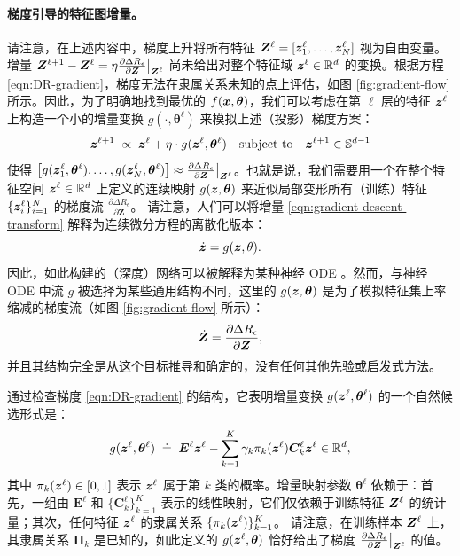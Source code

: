 \documentclass[../../book-main.tex]{subfiles}
\begin{document}
\paragraph{梯度引导的特征图增量。} 请注意，在上述内容中，梯度上升将所有特征 $\bm{Z}^{\ell} = [\bm{z}^{\ell}_{1}, \dots, \bm{z}^{\ell}_{N}]$ 视为自由变量。增量 $\bm{Z}^{\ell+1} - \bm{Z}^{\ell} = \eta \frac{\partial \Delta R_{\epsilon}}{\partial \bm Z}\big|_{\bm{Z}^\ell}$ 尚未给出对整个特征域 $\bm{z}^\ell \in \mathbb{R}^d$ 的变换。根据方程 \eqref{eqn:DR-gradient}，梯度无法在隶属关系未知的点上评估，如图 \ref{fig:gradient-flow} 所示。因此，为了明确地找到最优的 $f(\bm{x},\bm  \theta)$，我们可以考虑在第 $\ell$ 层的特征 $\bm{z}^\ell$ 上构造一个小的增量变换 $g(\cdot, \bm{\theta}^{\ell})$ 来模拟上述（投影）梯度方案：
\begin{equation}
\bm{z}^{\ell + 1}   \; \propto \; \bm{z}^{\ell} + \eta\cdot  g(\bm{z}^{\ell}, \bm{\theta}^{\ell}) \quad \mbox{subject to} \quad \bm{z}^{\ell +1} \in \mathbb{S}^{d-1}
\label{eqn:gradient-descent-transform}
\end{equation}
使得 $\big[g(\bm{z}_1^{\ell}, \bm \theta^{\ell}), \ldots, g(\bm{z}_N^{\ell}, \bm \theta^{\ell}) \big] \approx \frac{\partial \Delta R_{\epsilon}}{\partial \bm Z}\big|_{\bm{Z}^\ell}$。也就是说，我们需要用一个在整个特征空间 $\bm{z}^\ell \in \mathbb{R}^d$ 上定义的连续映射 $g(\bm{z},\bm \theta)$ 来近似局部变形所有（训练）特征 $\{\bm{z}_i^\ell\}_{i=1}^N$ 的梯度流 $\frac{\partial \Delta R_{\epsilon}}{\partial \bm Z}$。
请注意，人们可以将增量 \eqref{eqn:gradient-descent-transform} 解释为连续微分方程的离散化版本：
\begin{equation}
\dot{\bm{z}} = g(\bm{z}, \theta).
\end{equation}
因此，如此构建的（深度）网络可以被解释为某种神经 ODE \cite{chen2018neural}。然而，与神经 ODE 中流 $g$ 被选择为某些通用结构不同，这里的 $g(\bm{z}, \bm\theta)$ 是为了模拟特征集上率缩减的梯度流（如图 \ref{fig:gradient-flow} 所示）：
\begin{equation*}
    \dot{\bm{Z}} = \frac{\partial \Delta R_{\epsilon}}{\partial \bm Z},
\end{equation*}
并且其结构完全是从这个目标推导和确定的，没有任何其他先验或启发式方法。

通过检查梯度 \eqref{eqn:DR-gradient} 的结构，它表明增量变换 $g(\bm{z}^\ell, \bm \theta^\ell)$ 的一个自然候选形式是：
\begin{equation}
    g(\bm{z}^\ell, \bm \theta^\ell) \; \doteq \; \bm E^\ell \bm{z}^\ell - \sum_{k=1}^K \gamma_{k} \pi_k(\bm{z}^\ell)\bm C_{k}^{\ell}  \bm{z}^{\ell}  \in \mathbb{R}^d,
    \label{eqn:DR-gradient-transform}
\end{equation}
其中 $\pi_k(\bm{z}^\ell) \in [0,1]$ 表示 $\bm{z}^{\ell}$ 属于第 $k$ 类的概率。增量映射参数 $\bm \theta^\ell$ 依赖于：首先，一组由 $\bm E^{\ell}$ 和 $\{ \bm C^{\ell}_{k}\}_{k=1}^{K}$ 表示的线性映射，它们仅依赖于训练特征 $\bm{Z}^\ell$ 的统计量；其次，任何特征 $\bm{z}^\ell$ 的隶属关系 $\{ \pi_k(\bm{z}^\ell)\}_{k=1}^K$。
请注意，在训练样本 $\bm{Z}^\ell$ 上，其隶属关系 $\bm \Pi_k$ 是已知的，如此定义的 $g(\bm{z}^\ell, \bm \theta)$ 恰好给出了梯度 $\frac{\partial \Delta R_{\epsilon}}{\partial \bm Z}\big|_{\bm{Z}^\ell}$ 的值。
\end{document}

